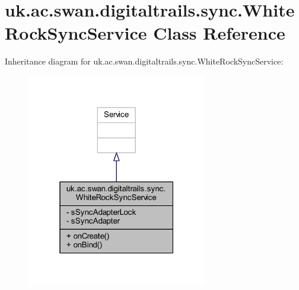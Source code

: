 \hypertarget{classuk_1_1ac_1_1swan_1_1digitaltrails_1_1sync_1_1_white_rock_sync_service}{\section{uk.\+ac.\+swan.\+digitaltrails.\+sync.\+White\+Rock\+Sync\+Service Class Reference}
\label{classuk_1_1ac_1_1swan_1_1digitaltrails_1_1sync_1_1_white_rock_sync_service}
}


Inheritance diagram for uk.\+ac.\+swan.\+digitaltrails.\+sync.\+White\+Rock\+Sync\+Service\+:
\nopagebreak
\begin{figure}[H]
\begin{center}
\leavevmode
\includegraphics[width=223pt]{classuk_1_1ac_1_1swan_1_1digitaltrails_1_1sync_1_1_white_rock_sync_service__inherit__graph}
\end{center}
\end{figure}


